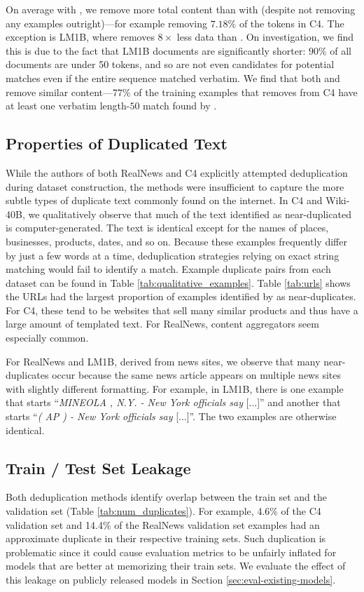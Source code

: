 On average with \Exact{}, we remove more total content than with \Approx{} (despite \Exact{} not removing any examples outright)---for example removing $7.18\%$ of the tokens in C4.
%
The exception is LM1B, where \Exact{} removes $8\times$ less data than
\Approx{}.
On investigation, we find this is due to the fact that LM1B documents are significantly shorter: $90\%$ of all documents are under 50 tokens, and so are not even candidates for potential matches even if the entire sequence matched verbatim.
%
We find that both \Approx{} and \Exact{} remove similar content---$77\%$ of the training examples that \Approx{} removes from C4 have at least one verbatim length-$50$ match found by \Exact{}.





\subsection{Properties of Duplicated Text}
While the authors of both RealNews and C4 explicitly attempted deduplication during dataset construction, the methods were insufficient to capture the more subtle types of duplicate text commonly found on the internet.
In C4 and Wiki-40B, we qualitatively observe that much of the text identified as near-duplicated is computer-generated.
The text is identical except for the names of places, businesses, products, dates, and so on. 
Because these examples frequently differ by just a few words at a time, deduplication strategies relying on exact string matching would fail to identify a match.
Example duplicate pairs from each dataset can be found in Table \ref{tab:qualitative_examples}.
Table \ref{tab:urls} shows the URLs had the largest proportion of examples identified by \Approx{} as near-duplicates. 
For C4, these tend to be websites that sell many similar products and thus have a large amount of templated text.
For RealNews, content aggregators seem especially common.

For RealNews and LM1B, derived from news sites, we observe that many near-duplicates occur because the same news article appears on multiple news sites with slightly different formatting.
For example, in LM1B, there is one example that starts ``\textit{MINEOLA , N.Y. - New York officials say} [...]'' and another that starts ``\textit{( AP ) - New York officials say} [...]''.
The two examples are otherwise identical.

\subsection{Train / Test Set Leakage}
\label{sec:leakage}
Both deduplication methods identify overlap between the train set and the validation set (Table \ref{tab:num_duplicates}).
For example, 4.6\% of the C4 validation set and 14.4\% of the RealNews validation set examples had an approximate duplicate in their respective training sets.
Such duplication is problematic since it could cause evaluation metrics to be unfairly inflated for models that are better at memorizing their train sets.
We evaluate the effect of this leakage on publicly released models in Section \ref{sec:eval-existing-models}.

